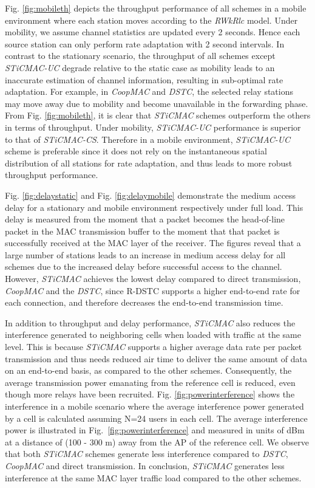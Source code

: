 \documentclass[peerreview,draftcls,onecolumn,12pt,a4paper]{IEEEtran}
\begin{document}
Fig. \ref{fig:mobileth} depicts the throughput performance of all
schemes in a mobile environment where each station moves according
to the \emph{RWkRlc} model. Under mobility, we assume channel statistics are updated every 2 seconds. Hence each source
station can only perform rate adaptation with 2 second intervals. In contrast to the stationary
scenario, the throughput of all schemes except \emph{STiCMAC-UC}
degrade relative to the static case as mobility leads to an
inaccurate estimation of channel information, resulting in
sub-optimal rate adaptation. For example, in \emph{CoopMAC} and
\emph{DSTC}, the selected relay stations may move away due to
mobility and become unavailable in the forwarding phase. From Fig.
\ref{fig:mobileth}, it is clear that \emph{STiCMAC} schemes
outperform the others in terms of throughput. Under
mobility, \emph{STiCMAC-UC} performance is superior to that of
\emph{STiCMAC-CS}. Therefore in a mobile environment,
\emph{STiCMAC-UC} scheme is preferable since it does not rely on
the instantaneous spatial distribution of all stations for rate
adaptation, and thus leads to more robust throughput performance.

Fig. \ref{fig:delaystatic} and Fig. \ref{fig:delaymobile}
demonstrate the medium access delay  for a stationary and mobile
environment respectively under full load. This delay is measured
from the moment that a packet becomes the {head-of-line} packet in
the MAC transmission buffer to the moment that that packet is
successfully received at the MAC layer of the receiver. The
figures reveal that a large number of stations leads to an
increase in medium access delay for all schemes due to the
increased delay before successful access to the channel. However,
\emph{STiCMAC} achieves the lowest delay compared to direct
transmission, \emph{CoopMAC}  and the \emph{DSTC}, since R-DSTC
supports a higher end-to-end rate for each connection, and
therefore decreases the end-to-end transmission time.

In addition to throughput and delay performance, \emph{STiCMAC}
also reduces the interference generated to neighboring cells when
loaded with traffic at the same level. This is because \emph{STiCMAC} supports a
higher average data rate per packet transmission and thus needs
reduced air time to deliver the same amount of data on an
end-to-end basis, as compared to the other schemes. Consequently,
the average transmission power emanating from the reference cell
is reduced, even though more relays have been recruited. Fig.
\ref{fig:powerinterference} shows the interference in a mobile
scenario where the average interference power generated by a cell
is calculated assuming N=24 users in each cell. The average
interference power is illustrated in
Fig.~\ref{fig:powerinterference} and measured in units of dBm at a
distance of (100 - 300 m) away from the AP of the reference cell.
We observe that both \emph{STiCMAC} schemes generate less
interference compared to {\em DSTC}, \emph{CoopMAC} and direct
transmission. In conclusion, \emph{STiCMAC} generates less
interference at the same MAC layer traffic load compared to the
other schemes.
\end{document}
